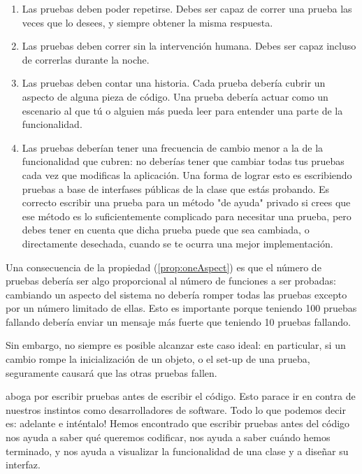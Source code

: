 \documentclass[a4paper,10pt,twoside]{book}
\begin{document}
\begin{enumerate}

\item Las pruebas deben poder repetirse. Debes ser capaz de correr una prueba
	las  veces que lo desees, y siempre obtener la misma respuesta.

\item Las pruebas deben correr sin la intervenci\'on humana. Debes ser capaz
	incluso de correrlas durante la noche.

\item Las pruebas deben contar una historia. Cada prueba deber\'ia cubrir un aspecto
	de alguna pieza de c\'odigo. Una prueba deber\'ia actuar como un escenario al que t\'u o alguien m\'as
	pueda leer para entender una parte de la funcionalidad. \label{prop:oneAspect}

\item Las pruebas deber\'ian tener una frecuencia de cambio menor
	a la de la funcionalidad que cubren: no deber\'ias tener que cambiar
	todas tus pruebas cada vez que modificas la aplicaci\'on.  Una forma de lograr
	esto es escribiendo pruebas a base de interfases p\'ublicas de la clase que
	est\'as probando.      
	Es correcto escribir una prueba para un m\'etodo "de ayuda" privado si crees que 
	ese m\'etodo es lo suficientemente complicado para necesitar una prueba, pero debes
	tener en cuenta que dicha prueba puede que sea cambiada, o directamente desechada,
	cuando se te ocurra una mejor implementaci\'on.
\end{enumerate}

Una consecuencia de la propiedad (\ref{prop:oneAspect}) es que 
el n\'umero de pruebas deber\'ia ser algo proporcional al n\'umero de funciones
a ser probadas: cambiando un aspecto del sistema no deber\'ia romper todas las pruebas
excepto por un n\'umero limitado de ellas. Esto es importante porque teniendo 100 pruebas fallando
deber\'ia enviar un mensaje m\'as fuerte que teniendo 10 pruebas fallando.
  
Sin embargo, no siempre es posible alcanzar este caso ideal: 
en particular, si un cambio rompe la inicializaci\'on de un objeto, o el set-up de una prueba,
seguramente causar\'a que las otras pruebas fallen.

 aboga por escribir pruebas antes de escribir el c\'odigo.
Esto parace ir en contra de nuestros instintos como desarrolladores de software. 
Todo lo que podemos decir es: adelante e int\'entalo!
Hemos encontrado que escribir pruebas antes del c\'odigo nos ayuda a saber qu\'e queremos codificar,
nos ayuda a saber cu\'ando hemos terminado, y nos ayuda a visualizar la funcionalidad
de una clase y a dise\~nar su interfaz.
\end{document}

